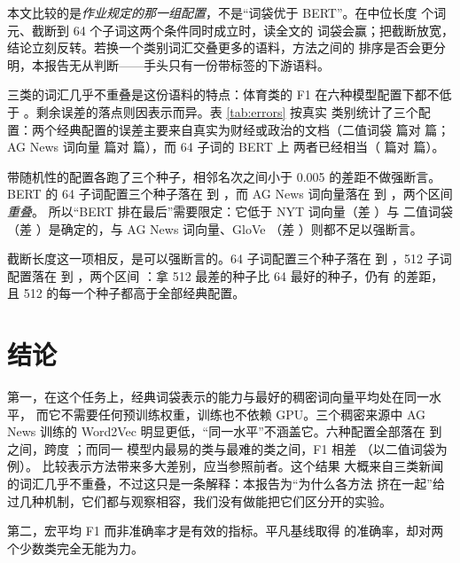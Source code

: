 \documentclass[11pt]{article}
\begin{document}
本文比较的是\emph{作业规定的那一组配置}，不是``词袋优于 BERT''。在中位长度
\resultMedianTokens{} 个词元、截断到 64 个子词这两个条件同时成立时，读全文的
词袋会赢；把截断放宽，结论立刻反转。若换一个类别词汇交叠更多的语料，方法之间的
排序是否会更分明，本报告无从判断——手头只有一份带标签的下游语料。



三类的词汇几乎不重叠是这份语料的特点：体育类的 F1 在六种模型配置下都不低于
\resultSportsFOneMin{}。剩余误差的落点则因表示而异。表 \ref{tab:errors} 按真实
类别统计了三个配置：两个经典配置的误差主要来自真实为财经或政治的文档（二值词袋
\resultErrBowBizPol{} 篇对 \resultErrBowSports{} 篇；AG News 词向量
\resultErrAgVecBizPol{} 篇对 \resultErrAgVecSports{} 篇），而 64 子词的 BERT 上
两者已经相当（\resultErrBertBizPol{} 篇对 \resultErrBertSports{} 篇）。

带随机性的配置各跑了三个种子，相邻名次之间小于 0.005 的差距不做强断言。BERT 的
64 子词配置三个种子落在 \resultBertSeedsWorst{} 到 \resultBertSeedsBest{}，而
AG News 词向量落在 \resultAgVecWorst{} 到 \resultAgVecBest{}，两个区间\emph{重叠}。
所以``BERT 排在最后''需要限定：它低于 NYT 词向量（差 \resultNytGapToBert{}）与
二值词袋（差 \resultBowGapToBert{}）是确定的，与 AG News 词向量、GloVe
（差 \resultBertOverGlove{}）则都不足以强断言。

截断长度这一项相反，是可以强断言的。64 子词配置三个种子落在
\resultBertSeedsWorst{} 到 \resultBertSeedsBest{}，512 子词配置落在
\resultBertLenSeedsWorst{} 到 \resultBertLenSeedsBest{}，两个区间
\resultTruncRangesOverlap：拿 512 最差的种子比 64 最好的种子，仍有
\resultTruncMinGain{} 的差距，且 512 的每一个种子都高于全部经典配置。

\section{结论}

第一，在这个任务上，经典词袋表示的能力与最好的稠密词向量平均处在同一水平，
而它不需要任何预训练权重，训练也不依赖 GPU。三个稠密来源中 AG News 训练的
Word2Vec 明显更低，``同一水平''不涵盖它。六种配置全部落在
\resultRangeLow{} 到 \resultRangeHigh{} 之间，跨度 \resultEmbedSpread{}；而同一
模型内最易的类与最难的类之间，F1 相差 \resultClassGap{}（以二值词袋为例）。
比较表示方法带来多大差别，应当参照前者。这个结果
大概来自三类新闻的词汇几乎不重叠，不过这只是一条解释：本报告为``为什么各方法
挤在一起''给过几种机制，它们都与观察相容，我们没有做能把它们区分开的实验。

第二，宏平均 F1 而非准确率才是有效的指标。平凡基线取得 \resultMajorityAcc{}
的准确率，却对两个少数类完全无能为力。
\end{document}
